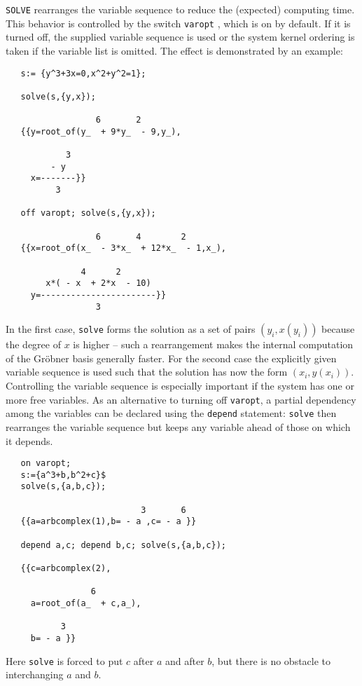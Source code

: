 \documentclass[11pt,letterpaper]{book}
\makeatletter
\newcommand{\underscore}{\_}
\newcommand{\ttindex}[1]{{\renewcommand{\_}{\protect\underscore}%
                          \index{#1@{\tt #1}}}}
\newcommand{\extendedmanual}[1]{#1}
\makeatother
\begin{document}
{\tt SOLVE} rearranges the variable sequence
to reduce the (expected) computing time. This behavior is controlled
by the switch {\tt varopt}\ttindex{varopt}, which is on by default.
If it is turned off, the supplied variable sequence is used
or the system kernel ordering is taken if the variable
list is omitted. The effect is demonstrated by an example:
{\small\begin{verbatim}
   s:= {y^3+3x=0,x^2+y^2=1};

   solve(s,{y,x});

                  6       2
   {{y=root_of(y_  + 9*y_  - 9,y_),

            3
         - y
     x=-------}}
          3

   off varopt; solve(s,{y,x});

                  6       4        2
   {{x=root_of(x_  - 3*x_  + 12*x_  - 1,x_),

               4      2
        x*( - x  + 2*x  - 10)
     y=-----------------------}}
                  3

\end{verbatim}}
In the first case, {\tt solve} forms the solution as a set of
pairs $(y_i,x(y_i))$ because the degree of $x$ is higher --
such a rearrangement makes the internal computation of the Gr\"obner basis
generally faster. For the second case the explicitly given variable sequence
is used such that the solution has now the form $(x_i,y(x_i))$.
Controlling the variable sequence is especially important if
the system has one or more free variables.
As an alternative to turning off {\tt varopt}, a partial dependency among
the variables can be declared using the {\tt depend}
statement: {\tt solve} then rearranges the variable sequence but keeps any
variable ahead of those on which it depends.
\extendedmanual{\newpage}
{\small\begin{verbatim}
   on varopt;
   s:={a^3+b,b^2+c}$
   solve(s,{a,b,c});

                           3       6
   {{a=arbcomplex(1),b= - a ,c= - a }}

   depend a,c; depend b,c; solve(s,{a,b,c});

   {{c=arbcomplex(2),

                 6
     a=root_of(a_  + c,a_),

           3
     b= - a }}
\end{verbatim}}
Here {\tt solve} is forced to put $c$ after $a$ and after $b$, but
there is no obstacle to interchanging $a$ and $b$.
\end{document}
